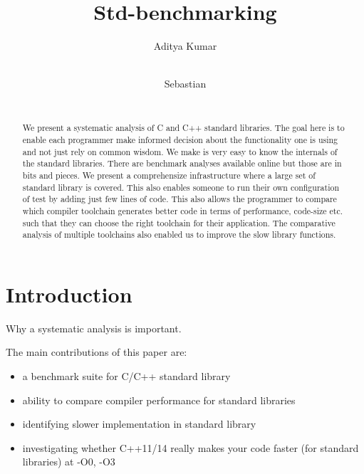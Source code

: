 \documentclass{sig-alternate}
\begin{document}
\def \GCC {GCC}
\def \LLVM {LLVM}

\setlength{\pdfpageheight}{\paperheight}
\setlength{\pdfpagewidth}{\paperwidth}

\title{Std-benchmarking}


\author{
\alignauthor
Aditya Kumar\\
       \\
\and
\alignauthor
Sebastian\\
       \\
}

\maketitle
\begin{abstract}
We present a systematic analysis of C and C++ standard libraries. The goal
here is to enable each programmer make informed decision about the functionality
one is using and not just rely on common wisdom. We make is very easy to know
the internals of the standard libraries. There are benchmark analyses available
online but those are in bits and pieces. We present a comprehensize infrastructure
where a large set of standard library is covered. This also enables someone
to run their own configuration of test by adding just few lines of code. This also
allows the programmer to compare which compiler toolchain generates better code
in terms of performance, code-size etc. such that they can choose the right
toolchain for their application. The comparative analysis of multiple toolchains
also enabled us to improve the slow library functions.
\end{abstract}

\section{Introduction}
Why a systematic analysis is important.

The main contributions of this paper are:
\begin{itemize}
\item a benchmark suite for C/C++ standard library
\item ability to compare compiler performance for standard libraries
\item identifying slower implementation in standard library
\item investigating whether C++11/14 really makes your code faster (for
standard libraries) at -O0, -O3
\end{itemize}
\end{document}

